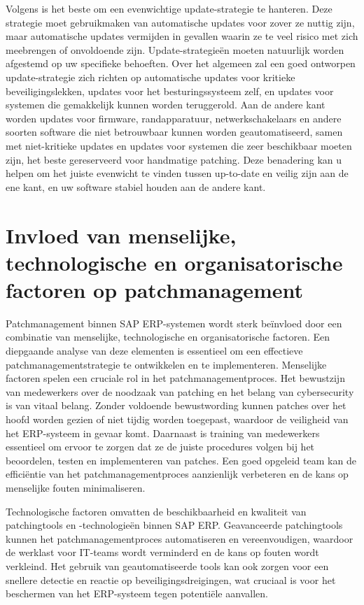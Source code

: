 Volgens \textcite{Tozzi2017} is het beste om een evenwichtige update-strategie te hanteren. Deze strategie moet gebruikmaken van automatische updates voor zover ze nuttig zijn, maar automatische updates vermijden in gevallen waarin ze te veel risico met zich meebrengen of onvoldoende zijn. Update-strategieën moeten natuurlijk worden afgestemd op uw specifieke behoeften. Over het algemeen zal een goed ontworpen update-strategie zich richten op automatische updates voor kritieke beveiligingslekken, updates voor het besturingssysteem zelf, en updates voor systemen die gemakkelijk kunnen worden teruggerold. Aan de andere kant worden updates voor firmware, randapparatuur, netwerkschakelaars en andere soorten software die niet betrouwbaar kunnen worden geautomatiseerd, samen met niet-kritieke updates en updates voor systemen die zeer beschikbaar moeten zijn, het beste gereserveerd voor handmatige patching. Deze benadering kan u helpen om het juiste evenwicht te vinden tussen up-to-date en veilig zijn aan de ene kant, en uw software stabiel houden aan de andere kant.

\section{Invloed van menselijke, technologische en organisatorische factoren op patchmanagement}
Patchmanagement binnen SAP ERP-systemen wordt sterk beïnvloed door een combinatie van menselijke, technologische en organisatorische factoren. Een diepgaande analyse van deze elementen is essentieel om een effectieve patchmanagementstrategie te ontwikkelen en te implementeren.
Menselijke factoren spelen een cruciale rol in het patchmanagementproces. Het bewustzijn van medewerkers over de noodzaak van patching en het belang van cybersecurity is van vitaal belang. Zonder voldoende bewustwording kunnen patches over het hoofd worden gezien of niet tijdig worden toegepast, waardoor de veiligheid van het ERP-systeem in gevaar komt. Daarnaast is training van medewerkers essentieel om ervoor te zorgen dat ze de juiste procedures volgen bij het beoordelen, testen en implementeren van patches. Een goed opgeleid team kan de efficiëntie van het patchmanagementproces aanzienlijk verbeteren en de kans op menselijke fouten minimaliseren.

Technologische factoren omvatten de beschikbaarheid en kwaliteit van patchingtools en -technologieën binnen SAP ERP. Geavanceerde patchingtools kunnen het patchmanagementproces automatiseren en vereenvoudigen, waardoor de werklast voor IT-teams wordt verminderd en de kans op fouten wordt verkleind. Het gebruik van geautomatiseerde tools kan ook zorgen voor een snellere detectie en reactie op beveiligingsdreigingen, wat cruciaal is voor het beschermen van het ERP-systeem tegen potentiële aanvallen.

